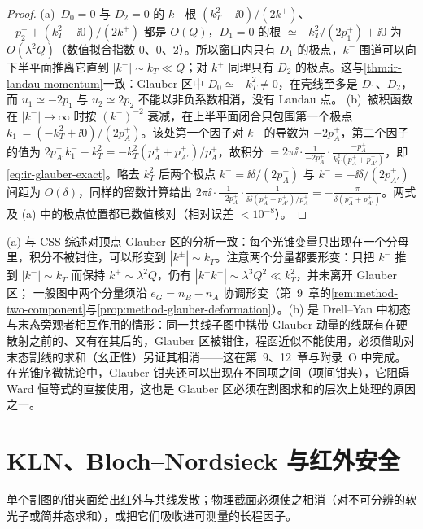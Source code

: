 \begin{proof}
(a)~$D_0=0$ 与 $D_2=0$ 的 $k^-$ 根 $(k_T^2-\ii0)/(2k^+)$、$-p_2^-+(k_T^2-\ii0)/(2k^+)$ 都是 $O(Q)$，$D_1=0$ 的根 $\simeq-k_T^2/(2p_1^+)+\ii0$ 为 $O(\lambda^2Q)$（数值拟合指数 $0$、$0$、$2$）。所以窗口内只有 $D_1$ 的极点，$k^-$ 围道可以向下半平面推离它直到 $|k^-|\sim k_T\ll Q$；对 $k^+$ 同理只有 $D_2$ 的极点。这与\cref{thm:ir-landau-momentum}一致：Glauber 区中 $D_0\simeq-k_T^2\ne0$，在壳线至多是 $D_1$、$D_2$，而 $u_1\simeq-2p_1$ 与 $u_2\simeq2p_2$ 不能以非负系数相消，没有 Landau 点。
(b)~被积函数在 $|k^-|\to\infty$ 时按 $(k^-)^{-2}$ 衰减，在上半平面闭合只包围第一个极点 $k^-_1=(-k_T^2+\ii0)/(2p_A^+)$。该处第一个因子对 $k^-$ 的导数为 $-2p_A^+$，第二个因子的值为 $2p_{A'}^+k^-_1-k_T^2=-k_T^2(p_A^++p_{A'}^+)/p_A^+$，故积分 $=2\pi\ii\cdot\frac{1}{-2p_A^+}\cdot\frac{-p_A^+}{k_T^2(p_A^++p_{A'}^+)}$，即\cref{eq:ir-glauber-exact}。略去 $k_T^2$ 后两个极点 $k^-=\ii\delta/(2p_A^+)$ 与 $k^-=-\ii\delta/(2p_{A'}^+)$ 间距为 $O(\delta)$，同样的留数计算给出 $2\pi\ii\cdot\frac1{-2p_A^+}\cdot\frac{1}{\ii\delta(p_A^++p_{A'}^+)/p_A^+}=-\frac{\pi}{\delta(p_A^++p_{A'}^+)}$。两式及 (a) 中的极点位置都已数值核对（相对误差 $<10^{-8}$）。
\end{proof}

(a) 与 CSS 综述对顶点 Glauber 区的分析一致：每个光锥变量只出现在一个分母里，积分不被钳住，可以形变到 $|k^\pm|\sim k_T$\cite[第~8.4~节，式~(137)--(138)]{CollinsSoperSterman1989}。注意两个分量都要形变：只把 $k^-$ 推到 $|k^-|\sim k_T$ 而保持 $k^+\sim\lambda^2Q$，仍有 $|k^+k^-|\sim\lambda^3Q^2\ll k_T^2$，并未离开 Glauber 区；%
一般图中两个分量须沿 $e_G=n_B-n_A$ 协调形变（第~9~章的\cref{rem:method-two-component}与\cref{prop:method-glauber-deformation}）。(b) 是 Drell--Yan 中初态与末态旁观者相互作用的情形：同一共线子图中携带 Glauber 动量的线既有在硬散射之前的、又有在其后的，Glauber 区被钳住，程函近似不能使用，必须借助对末态割线的求和（幺正性）另证其相消——这在第~9、12~章与附录~O 中完成。在光锥序微扰论中，Glauber 钳夹还可以出现在不同项之间（项间钳夹），它阻碍 Ward 恒等式的直接使用，这也是 Glauber 区必须在割图求和的层次上处理的原因之一。
\section{KLN、Bloch--Nordsieck 与红外安全}\label{sec:ir-cancellation}

单个割图的钳夹面给出红外与共线发散；物理截面必须使之相消（对不可分辨的软光子或简并态求和），或把它们吸收进可测量的长程因子。

